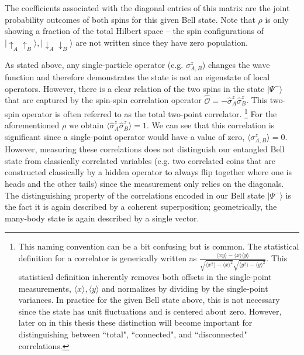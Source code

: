 The coefficients associated with the diagonal entries of this matrix are the joint probability outcomes of both spins for this given Bell state.  Note that $\rho$ is only showing a fraction of the total Hilbert space -- the spin configurations of $|\uparrow_A \uparrow_B\rangle, |\downarrow_A \downarrow_B \rangle$ are not written since they have zero population. 

As stated above, any single-particle operator (e.g. $\sigma_{A,B}^z$) changes the wave function and therefore demonstrates the state is not an eigenstate of local operators. However, there is a clear relation of the two spins in the state $| \Psi^- \rangle$ that are captured by the spin-spin correlation operator  $\hat{\mathcal{O}} = -\hat{\sigma}^z_A \hat{\sigma}^z_B$. This two-spin operator is often referred to as the total two-point correlator. \footnote{This naming convention can be a bit confusing but is common. The statistical definition for a correlator is generically written as $\frac{\langle x y \rangle - \langle x\rangle \langle y \rangle }{\sqrt{\langle x^2 \rangle - \langle x \rangle^2} \sqrt{\langle y^2 \rangle - \langle y \rangle^2}}$. This statistical definition inherently removes both offsets in the single-point measurements, $\langle x \rangle, \langle y \rangle$ and normalizes by dividing by the single-point variances. In practice for the given Bell state above, this is not necessary since the state has unit fluctuations and is centered about zero. However, later on in this thesis these distinction will become important for distinguishing between ``total", ``connected", and ``disconnected" correlations.} For the aforementioned $\rho$ we obtain $\langle \hat{\sigma}^z_A \hat{\sigma}^z_B \rangle = 1$. We can see that this correlation is significant since a single-point operator would have a value of zero, $\langle \sigma^z_{A,B} \rangle = 0$. However, measuring these correlations does not distinguish our entangled Bell state from classically correlated variables (e.g. two correlated coins that are constructed classically by a hidden operator to always flip together where one is heads and the other tails) since the measurement only relies on the diagonals. The distinguishing property of the correlations encoded in our Bell state $| \Psi^- \rangle$ is the fact it is again described by a coherent superposition; geometrically, the many-body state is again described by a single vector. 

